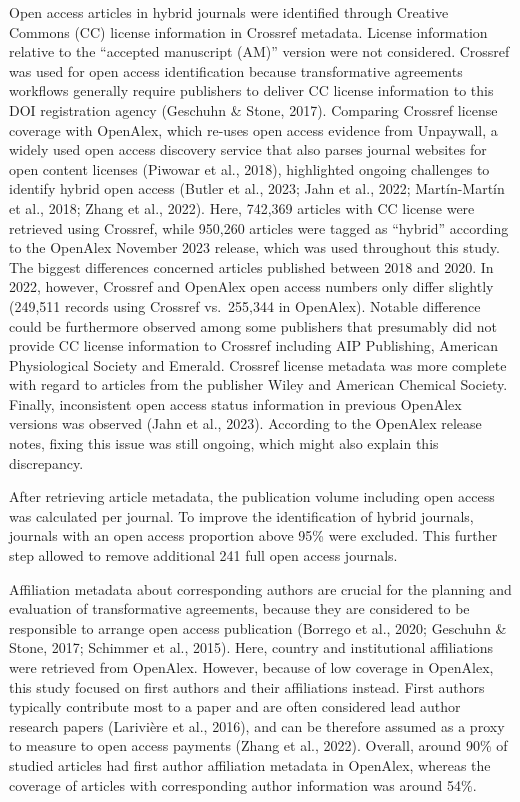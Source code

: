 \documentclass[a4paper,man,floatsintext,longtable,noextraspace,12pt]{apa6}
\begin{document}
Open access articles in hybrid journals were identified through Creative
Commons (CC) license information in Crossref metadata. License
information relative to the ``accepted manuscript (AM)'' version were
not considered. Crossref was used for open access identification because
transformative agreements workflows generally require publishers to
deliver CC license information to this DOI registration agency (Geschuhn
\& Stone, 2017). Comparing Crossref license coverage with OpenAlex,
which re-uses open access evidence from Unpaywall, a widely used open
access discovery service that also parses journal websites for open
content licenses (Piwowar et al., 2018), highlighted ongoing challenges
to identify hybrid open access (Butler et al., 2023; Jahn et al., 2022;
Martín-Martín et al., 2018; Zhang et al., 2022). Here, 742,369 articles
with CC license were retrieved using Crossref, while 950,260 articles
were tagged as ``hybrid'' according to the OpenAlex November 2023
release, which was used throughout this study. The biggest differences
concerned articles published between 2018 and 2020. In 2022, however,
Crossref and OpenAlex open access numbers only differ slightly (249,511
records using Crossref vs.~255,344 in OpenAlex). Notable difference
could be furthermore observed among some publishers that presumably did
not provide CC license information to Crossref including AIP Publishing,
American Physiological Society and Emerald. Crossref license metadata
was more complete with regard to articles from the publisher Wiley and
American Chemical Society. Finally, inconsistent open access status
information in previous OpenAlex versions was observed (Jahn et al.,
2023). According to the OpenAlex release notes, fixing this issue was
still ongoing, which might also explain this discrepancy.

After retrieving article metadata, the publication volume including open
access was calculated per journal. To improve the identification of
hybrid journals, journals with an open access proportion above 95\% were
excluded. This further step allowed to remove additional 241 full open
access journals.

Affiliation metadata about corresponding authors are crucial for the
planning and evaluation of transformative agreements, because they are
considered to be responsible to arrange open access publication (Borrego
et al., 2020; Geschuhn \& Stone, 2017; Schimmer et al., 2015). Here,
country and institutional affiliations were retrieved from OpenAlex.
However, because of low coverage in OpenAlex, this study focused on
first authors and their affiliations instead. First authors typically
contribute most to a paper and are often considered lead author research
papers (Larivière et al., 2016), and can be therefore assumed as a proxy
to measure to open access payments (Zhang et al., 2022). Overall, around
90\% of studied articles had first author affiliation metadata in
OpenAlex, whereas the coverage of articles with corresponding author
information was around 54\%.
\end{document}

